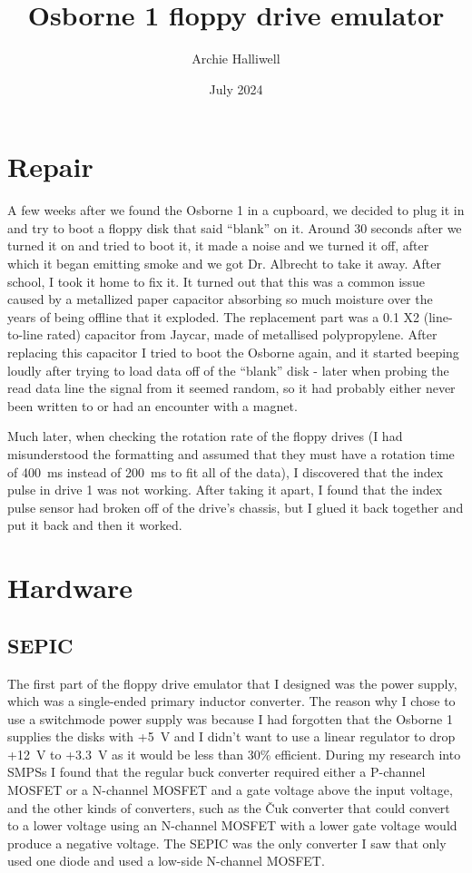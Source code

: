 \documentclass[a4paper]{article}
\begin{document}
\title{Osborne 1 floppy drive emulator}
\date{July 2024}
\author{Archie Halliwell}
\maketitle

\section{Repair}

A few weeks after we found the Osborne 1 in a cupboard, we decided to
plug it in and try to boot a floppy disk that said ``blank'' on
it. Around 30 seconds after we turned it on and tried to boot it, it
made a noise and we turned it off, after which it began emitting smoke
and we got Dr. Albrecht to take it away. After school, I took it home
to fix it. It turned out that this was a common issue caused by a
metallized paper capacitor absorbing so much moisture over the years
of being offline that it exploded. The replacement part was a
\qty{0.1}{\uF} X2 (line-to-line rated) capacitor from Jaycar, made of
metallised polypropylene. After replacing this capacitor I tried to
boot the Osborne again, and it started beeping loudly after trying to
load data off of the ``blank'' disk - later when probing the read data
line the signal from it seemed random, so it had probably either never
been written to or had an encounter with a magnet.

Much later, when checking the rotation rate of the floppy drives (I
had misunderstood the formatting and assumed that they must have a
rotation time of \qty{400}{\ms} instead of \qty{200}{\ms} to fit all of the data), I
discovered that the index pulse in drive 1 was not working. After
taking it apart, I found that the index pulse sensor had broken off of
the drive's chassis, but I glued it back together and put it back and
then it worked.

\section{Hardware}

\subsection{SEPIC}

The first part of the floppy drive emulator that I designed was the
power supply, which was a single-ended primary inductor converter. The
reason why I chose to use a switchmode power supply was because I had
forgotten that the Osborne 1 supplies the disks with +5~V and I didn't
want to use a linear regulator to drop +12~V to +3.3~V as it would be
less than 30\% efficient. During my research into SMPSs I found that
the regular buck converter required either a P-channel MOSFET or a
N-channel MOSFET and a gate voltage above the input voltage, and the
other kinds of converters, such as the \v{C}uk converter that could
convert to a lower voltage using an N-channel MOSFET with a lower gate
voltage would produce a negative voltage. The SEPIC was the only
converter I saw that only used one diode and used a low-side N-channel
MOSFET.
\end{document}
